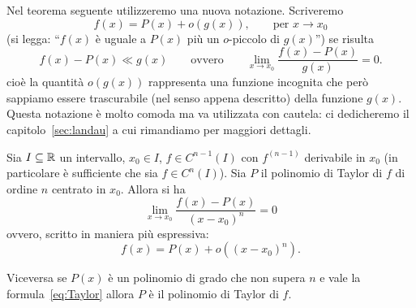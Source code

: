 Nel teorema seguente utilizzeremo una nuova notazione. Scriveremo
\[
  f(x) = P(x) + o(g(x)), \qquad \text{per $x\to x_0$}
\]
(si legga: ``$f(x)$ è uguale a $P(x)$ più un $o$-piccolo di $g(x)$'')
se risulta
\[
  f(x) - P(x) \ll g(x)
  \qquad\text{ovvero}\qquad
  \lim_{x\to x_0} \frac{f(x)-P(x)}{g(x)} = 0.
\]
cioè la quantità $o(g(x))$ rappresenta una funzione incognita
che però sappiamo essere trascurabile (nel senso appena descritto)
della funzione $g(x)$.
Questa notazione è molto comoda ma va utilizzata con cautela:
ci dedicheremo il capitolo~\ref{sec:landau} a cui rimandiamo
per maggiori dettagli.

\begin{theorem}
\label{th:taylor_peano}
\mymark{***}%
Sia $I\subseteq \mathbb R$ un intervallo, $x_0\in I$, $f\in C^{n-1}(I)$ con $f^{(n-1)}$
derivabile in $x_0$
(in particolare è sufficiente che sia $f\in C^n(I)$).
Sia $P$ il polinomio di Taylor di $f$ di ordine $n$ centrato in $x_0$. Allora si ha
\[
  \lim_{x\to x_0}\frac{f(x) - P(x)}{(x-x_0)^n} = 0
\]
ovvero, scritto in maniera più espressiva:
\begin{equation}\label{eq:Taylor}
  f(x) = P(x) + o((x-x_0)^n).
\end{equation}

Viceversa se $P(x)$ è un polinomio di grado che non supera $n$ e vale la
formula~\eqref{eq:Taylor} allora $P$ è il polinomio di Taylor di $f$.
\end{theorem}
%
